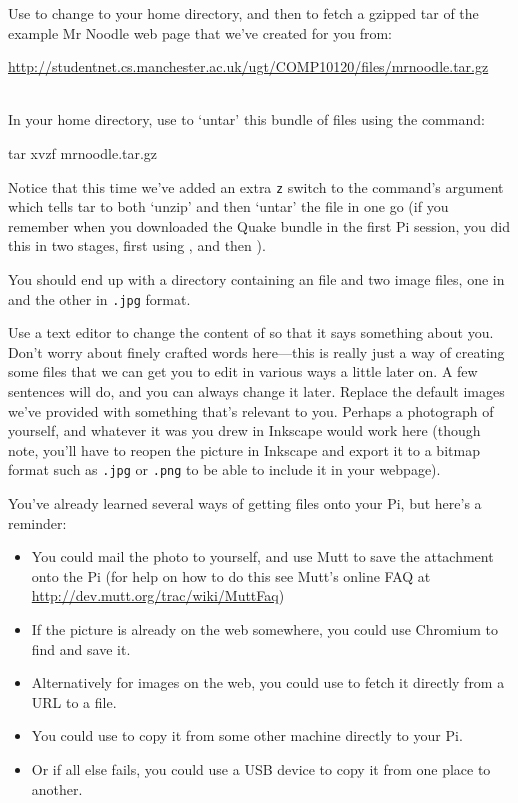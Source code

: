 Use  to change to your home directory, and then  to fetch a gzipped tar of the example Mr Noodle web page that we've created for you from:
\\

{\small

\url{http://studentnet.cs.manchester.ac.uk/ugt/COMP10120/files/mrnoodle.tar.gz}
}
\\

In your home directory, use  to `untar' this bundle of files using the command:

\begin{ttoutenv}
tar xvzf mrnoodle.tar.gz
\end{ttoutenv}

Notice that this time we've added an extra \texttt{z} switch to the  command's argument which tells tar to both `unzip' and then `untar' the file in one go (if you remember when you downloaded the Quake bundle in the first Pi session, you did this in two stages, first using , and then ).

You should end up with a  directory containing an  file and two image files, one in  and the other in \texttt{.jpg} format.

Use a text editor to change the content of  so that it says something about you. Don't worry about finely crafted words here---this is really just a way of creating some files that we can get you to edit in various ways a little later on. A few sentences will do, and you can always change it later. Replace the default images we've provided with something that's relevant to you. Perhaps a photograph of yourself, and whatever it was you drew in Inkscape would work here (though note, you'll have to reopen the picture in Inkscape and export it to a bitmap format such as \texttt{.jpg} or \texttt{.png} to be able to include it in your webpage).

You've already learned several ways of getting files onto your Pi, but here's a reminder:
\begin{itemize}
\item You could mail the photo to yourself, and use Mutt to save the attachment onto the Pi (for help on how to do this see Mutt's online FAQ at \url{http://dev.mutt.org/trac/wiki/MuttFaq})
\item If the picture is already on the web somewhere, you could use Chromium to find and save it.
\item Alternatively for images on the web, you could use  to fetch it directly from a URL to a file.
\item You could use  to copy it from some other machine directly to your Pi.
\item Or if all else fails, you could use a USB device to copy it from one place to another.
\end{itemize}

